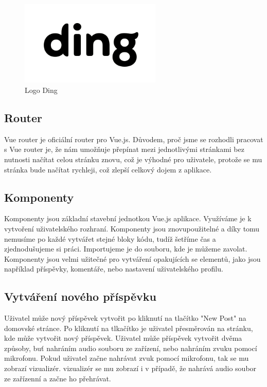\begin{figure}[h!] 
    \centering
    \includegraphics[width=0.6\textwidth]{images/dinglogo.png}
    \caption{Logo Ding}
    \label{ding-logo}
\end{figure}

\subsection{Router}

Vue router je oficiální router pro Vue.js. Důvodem, proč jsme se rozhodli
pracovat s Vue router je, že nám umožňuje přepínat mezi jednotlivými stránkami
bez nutnosti načítat celou stránku znovu, což je výhodné pro uživatele, protože
se mu stránka bude načítat rychleji, což zlepší celkový dojem z aplikace.

\subsection{Komponenty}

Komponenty jsou základní stavební jednotkou Vue.js aplikace. Využíváme je
k vytvoření uživatelského rozhraní. Komponenty jsou znovupoužitelné a díky tomu
nemusíme po každé vytvářet stejné bloky kódu, tudíž šetříme čas a zjednodušujeme
si práci. Importujeme je do souboru, kde je můžeme zavolat. Komponenty jsou velmi
užitečné pro vytváření opakujících se elementů, jako jsou například příspěvky, 
komentáře, nebo nastavení uživatelského profilu. 

\subsection{Vytváření nového příspěvku}

Uživatel může nový příspěvek vytvořit po kliknutí na tlačítko "New Post" na domovské
stránce. Po kliknutí na tlkačítko je uživatel přesměrován na stránku, kde může
vytvořit nový příspěvek. Uživatel může příspěvek vytvořit dvěma způsoby, buť nahráním 
audio souboru ze zařízení, nebo nahráním zvuku pomocí mikrofonu. Pokud uživatel 
začne nahrávat zvuk pomocí mikrofonu, tak se mu zobrazí vizualizér. vizualizér se
mu zobrazí i v případě, že nahrává audio soubor ze zařízenní a začne ho přehrávat.

